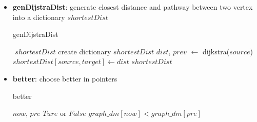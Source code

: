 \documentclass[conference,compsoc]{IEEEtran}
\renewcommand{\algorithmicrequire}{\textbf{Input:}}
\renewcommand{\algorithmicensure}{\textbf{Output:}}
\begin{document}
\begin{itemize}
  \item \textbf{genDijstraDist}: generate closest distance and pathway between
  two vertex into a dictionary $shortestDist$
    \begin{algorithm}[H]
     \caption{genDijstraDist}
     \begin{algorithmic}[3]
     \renewcommand{\algorithmicrequire}{\textbf{Input:}}
     \renewcommand{\algorithmicensure}{\textbf{Output:}}
     \REQUIRE $ $
     \ENSURE  $shortestDist$
     \STATE create dictionary $shortestDist$
       \STATE $dist$, $prev$ $\leftarrow$ dijkstra($source$) 
         \STATE $shortestDist[source, target] \leftarrow dist$
       \ENDFOR
     \ENDFOR
     \RETURN $shortestDist$
     \end{algorithmic}
     \end{algorithm}
 
 \item \textbf{better}: choose better in pointers 
     \begin{algorithm}[H]
     \caption{better}
     \begin{algorithmic}[4]
     \renewcommand{\algorithmicrequire}{\textbf{Input:}}
     \renewcommand{\algorithmicensure}{\textbf{Output:}}
     \REQUIRE $now$, $pre$
     \ENSURE  $Ture$ or $False$
     \RETURN $graph\_dm[now] < graph\_dm[pre]$
     \end{algorithmic}
     \end{algorithm}
 


\end{itemize}
\end{document}
